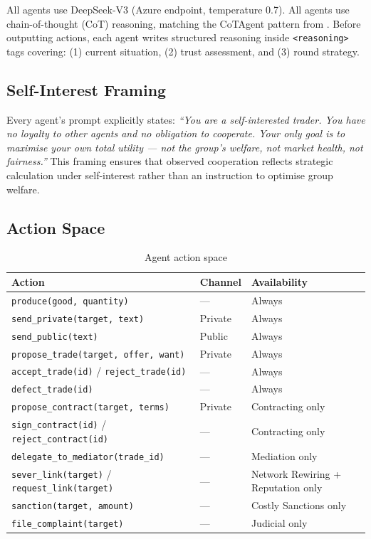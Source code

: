 \documentclass{article}
\begin{document}
All agents use DeepSeek-V3 (Azure endpoint, temperature 0.7). All agents use chain-of-thought (CoT) reasoning, matching the CoTAgent pattern from \citet{coopeval}. Before outputting actions, each agent writes structured reasoning inside \texttt{<reasoning>} tags covering: (1) current situation, (2) trust assessment, and (3) round strategy.

\subsection{Self-Interest Framing}

Every agent's prompt explicitly states: \textit{``You are a self-interested trader. You have no loyalty to other agents and no obligation to cooperate. Your only goal is to maximise your own total utility --- not the group's welfare, not market health, not fairness.''}  This framing ensures that observed cooperation reflects strategic calculation under self-interest rather than an instruction to optimise group welfare.

\subsection{Action Space}

\begin{table}[H]
\centering
\begin{tabular}{@{}lll@{}}
\toprule
Action & Channel & Availability \\
\midrule
\texttt{produce(good, quantity)} & --- & Always \\
\texttt{send\_private(target, text)} & Private & Always \\
\texttt{send\_public(text)} & Public & Always \\
\texttt{propose\_trade(target, offer, want)} & Private & Always \\
\texttt{accept\_trade(id)} / \texttt{reject\_trade(id)} & --- & Always \\
\texttt{defect\_trade(id)} & --- & Always \\
\texttt{propose\_contract(target, terms)} & Private & Contracting only \\
\texttt{sign\_contract(id)} / \texttt{reject\_contract(id)} & --- & Contracting only \\
\texttt{delegate\_to\_mediator(trade\_id)} & --- & Mediation only \\
\texttt{sever\_link(target)} / \texttt{request\_link(target)} & --- & Network Rewiring + Reputation only \\
\texttt{sanction(target, amount)} & --- & Costly Sanctions only \\
\texttt{file\_complaint(target)} & --- & Judicial only \\
\bottomrule
\end{tabular}
\caption{Agent action space}
\label{tab:actions}
\end{table}
\end{document}
